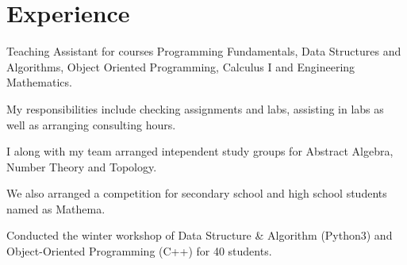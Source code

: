 \documentclass[]{resume}
\begin{document}


%
%

\begin{minipage}[t]{0.5\textwidth}


    \section{Experience}

    \vspace{\topsep} %
    \begin{tightemize}
        \sectionsep
        \item Teaching Assistant for courses Programming Fundamentals, Data Structures and Algorithms, Object Oriented Programming, Calculus I and Engineering Mathematics.
        \item My responsibilities include checking assignments and labs, assisting in labs as well as arranging consulting hours.
    \end{tightemize}
    \begin{tightemize}
        \sectionsep
        \item I along with my team arranged intependent study groups for Abstract Algebra, Number Theory and Topology.
        \item We also arranged a competition for secondary school and high school students named as Mathema.
    \end{tightemize}

    \begin{tightemize}
        \sectionsep
        \item Conducted the winter workshop of Data Structure \& Algorithm (Python3) and Object-Oriented Programming (C++) for 40 students.
    \end{tightemize}


\end{minipage}
\end{document}
